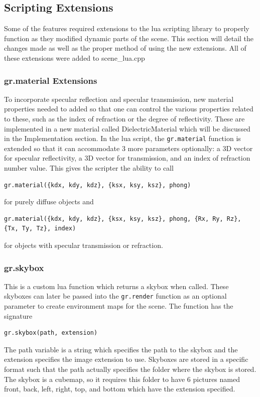 \documentclass {article}
\begin{document}
\subsection{Scripting Extensions}
Some of the features required extensions to the lua scripting library to properly function as they
modified dynamic parts of the scene. This section will detail the changes made as well as the proper 
method of using the new extensions. All of these extensions were added to scene\_lua.cpp
\subsubsection{gr.material Extensions} \label{material_ext}
To incorporate specular reflection and specular transmission, new material properties needed 
to added so that one can control the various properties related to these, such as the index
of refraction or the degree of reflectivity. These are implemented in a new material called DielectricMaterial
which will be discussed in the Implementation section. In the lua script, the \texttt{gr.material}
function is extended so that it can accommodate 3 more parameters optionally: a 3D vector for
specular reflectivity, a 3D vector for transmission, and an index of refraction number value. This gives the 
scripter the ability to call
\begin{verbatim}
gr.material({kdx, kdy, kdz}, {ksx, ksy, ksz}, phong)
\end{verbatim}
for purely diffuse objects and
\begin{verbatim}
gr.material({kdx, kdy, kdz}, {ksx, ksy, ksz}, phong, {Rx, Ry, Rz}, {Tx, Ty, Tz}, index)
\end{verbatim}
for objects with specular transmission or refraction.
\subsubsection{gr.skybox} \label{skybox_ref}
This is a custom lua function which returns a skybox when called. These skyboxes can
later be passed into the \texttt{gr.render} function as an optional parameter to create
environment maps for the scene. The function has the signature
\begin{verbatim}
gr.skybox(path, extension)
\end{verbatim}
The path variable is a string which specifies the path to the skybox and the extension
specifies the image extension to use. Skyboxes are stored in a specific format such that
the path actually specifies the folder where the skybox is stored. The skybox is a cubemap, so
it requires this folder to have 6 pictures named front, back, left, right, top, and bottom which
have the extension specified.
\end{document}
